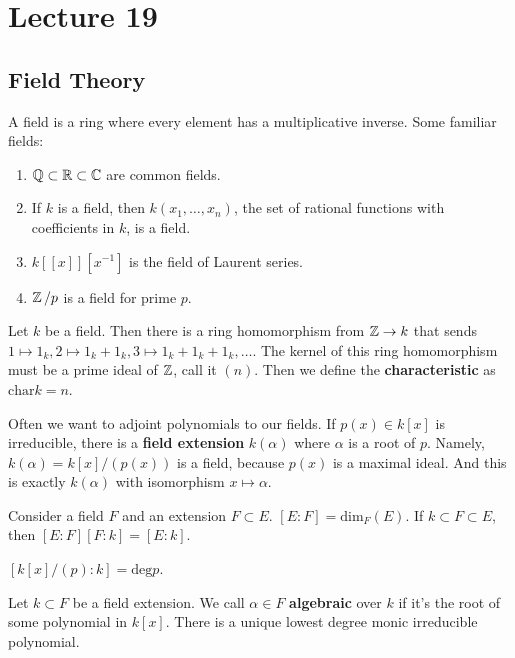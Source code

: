 \section{Lecture 19}
\subsection{Field Theory}
A field is a ring where every element has a multiplicative inverse.
Some familiar fields:
\begin{enumerate}
    \item $\operatorname{\mathbb{Q}} \subset \operatorname{\mathbb{R}} \subset \operatorname{\mathbb{C}}$ are common fields.
    \item If $k$ is a field, then $k(x_1, \dots, x_n)$,
    the set of rational functions with coefficients in $k$,
    is a field.
    \item $k[[x]][x^{-1}]$ is the field of Laurent series.
    \item $\operatorname{\mathbb{Z}}/p$ is a field for prime $p$.
\end{enumerate}

\begin{definition}
    Let $k$ be a field. Then
    there is a ring homomorphism from $\operatorname{\mathbb{Z}} \to k$
    that sends $1 \mapsto 1_k, 2 \mapsto 1_k + 1_k, 3 \mapsto 1_k + 1_k + 1_k, \dots$.
    The kernel of this ring homomorphism must be a prime ideal of $\operatorname{\mathbb{Z}}$,
    call it $(n)$. Then we define the \textbf{characteristic} as $\text{char} k = n$.
\end{definition}

Often we want to adjoint polynomials to our fields.
If $p(x) \in k[x]$ is irreducible,
there is a \textbf{field extension} $k(\alpha)$
where $\alpha$ is a root of $p$. Namely,
$k(\alpha) = k[x]/(p(x))$ is a field, because $p(x)$ is a maximal ideal.
And this is exactly $k(\alpha)$ with isomorphism $x \mapsto \alpha$.
\begin{definition}
    Consider a field $F$ and an extension $F \subset E$. $[E : F] = \text{dim}_F(E)$.
    If $k \subset F \subset E$, then $[E: F][F: k] = [E: k]$.
\end{definition}

\begin{theorem}
    $[k[x]/(p) : k] = \text{deg} p$.
\end{theorem}

\begin{definition}
    Let $k \subset F$ be a field extension.
    We call $\alpha \in F$ \textbf{algebraic} over $k$ if it's the root of some polynomial in $k[x]$.
    There is a unique lowest degree monic irreducible polynomial.  
\end{definition}

